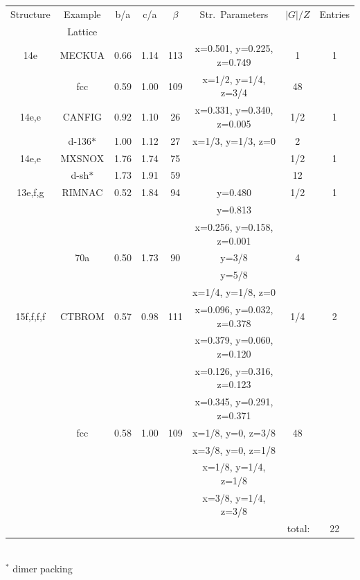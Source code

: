 \documentclass[preprint]{revtex4}              %
\begin{document}
\begin{landscape}
\begin{table}
\begin{center}
\begin{tabular}{cccccccc}%
\cline{1-8}
Structure & Example & b/a & c/a & $\beta$ & Str.\ Parameters & $|G|/Z$ & Entries \\
          & Lattice \\
\cline{1-8}
14e     & MECKUA    & 0.66 & 1.14 & 113 & x=0.501, y=0.225, z=0.749 & 1 & 1 \\
        & fcc       & 0.59 & 1.00 & 109 & x=1/2, y=1/4, z=3/4       & 48 \\
14e,e   & CANFIG    & 0.92 & 1.10 & 26  & x=0.331, y=0.340, z=0.005 & 1/2 & 1 \\
        & d-136$*$  & 1.00 & 1.12 & 27  & x=1/3, y=1/3, z=0         & 2 \\
14e,e   & MXSNOX    & 1.76 & 1.74 & 75  & & 1/2 & 1 \\
        & d-sh$*$   & 1.73 & 1.91 & 59  & & 12 \\
13e,f,g & RIMNAC    & 0.52 & 1.84 &  94 & y=0.480 & 1/2 & 1 \\
        &           &      &      &     & y=0.813 \\
        &           &      &      &     & x=0.256, y=0.158, z=0.001 \\
        & 70a       & 0.50 & 1.73 &  90 & y=3/8   & 4 \\
        &           &      &      &     & y=5/8 \\
        &           &      &      &     & x=1/4, y=1/8, z=0 \\
15f,f,f,f  & CTBROM & 0.57 & 0.98 & 111 & x=0.096, y=0.032, z=0.378 & 1/4 & 2 \\
        &           &      &      &     & x=0.379, y=0.060, z=0.120  \\
        &           &      &      &     & x=0.126, y=0.316, z=0.123  \\
        &           &      &      &     & x=0.345, y=0.291, z=0.371  \\
        & fcc       & 0.58 & 1.00 & 109 & x=1/8, y=0, z=3/8          & 48 \\
        &           &      &      &     & x=3/8, y=0, z=1/8  \\
        &           &      &      &     & x=1/8, y=1/4, z=1/8  \\
        &           &      &      &     & x=3/8, y=1/4, z=3/8  \\
\cline{8-8}
\multicolumn{7}{r}{total:} & 22 \\
\cline{1-8}
\end{tabular}\\
$^*$ dimer packing
\end{center}
\end{table}
\end{landscape}
\end{document}
